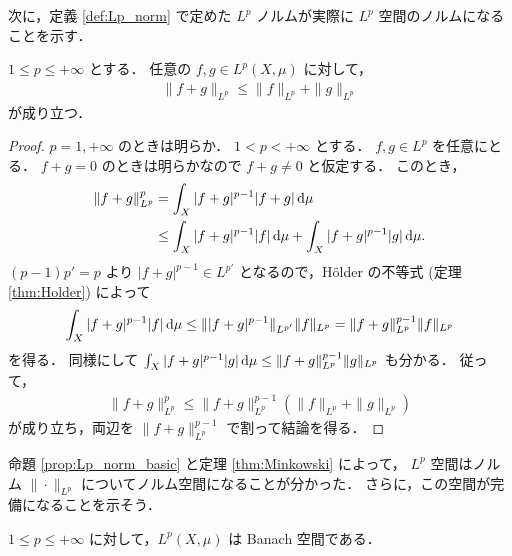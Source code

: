 次に，定義 \ref{def:Lp_norm} で定めた $L^p$ ノルムが実際に $L^p$ 空間のノルムになることを示す．

\begin{theorem}\label{thm:Minkowski}
    $1\le p\le+\infty$ とする．
    任意の $f,g\in L^p(X,\mu)$ に対して，
    \begin{align*}
        \|f+g\|_{L^p}\le\|f\|_{L^p}+\|g\|_{L^p}
    \end{align*}
    が成り立つ．
\end{theorem}

\begin{proof}
    $p=1,+\infty$ のときは明らか．
    $1<p<+\infty$ とする．
    $f,g\in L^p$ を任意にとる．
    $f+g=0$ のときは明らかなので $f+g\ne0$ と仮定する．
    このとき，
    \begin{align*}
        \|f+g\|_{L^p}^p
        &=\int_X|f+g|^{p-1}|f+g|\,\mathrm{d}\mu\\
        &\le\int_X|f+g|^{p-1}|f|\,\mathrm{d}\mu+\int_X|f+g|^{p-1}|g|\,\mathrm{d}\mu.
    \end{align*}
    $(p-1)p'=p$ より $|f+g|^{p-1}\in L^{p'}$ となるので，H\"older の不等式 (定理 \ref{thm:Holder}) によって
    \begin{align*}
        \int_X|f+g|^{p-1}|f|\,\mathrm{d}\mu
        \le\||f+g|^{p-1}\|_{L^{p'}}\|f\|_{L^p}
        =\|f+g\|_{L^p}^{p-1}\|f\|_{L^p}
    \end{align*}
    を得る．
    同様にして $\int_X|f+g|^{p-1}|g|\,\mathrm{d}\mu\le\|f+g\|_{L^p}^{p-1}\|g\|_{L^p}$ も分かる．
    従って，
    \begin{align*}
        \|f+g\|_{L^p}^p
        \le\|f+g\|_{L^p}^{p-1}(\|f\|_{L^p}+\|g\|_{L^p})
    \end{align*}
    が成り立ち，両辺を $\|f+g\|_{L^p}^{p-1}$ で割って結論を得る．
\end{proof}

命題 \ref{prop:Lp_norm_basic} と定理 \ref{thm:Minkowski} によって，
$L^p$ 空間はノルム $\|\cdot\|_{L^p}$ についてノルム空間になることが分かった．
さらに，この空間が完備になることを示そう．

\begin{theorem}
    $1\le p\le+\infty$ に対して，$L^p(X,\mu)$ は Banach 空間である．
\end{theorem}
